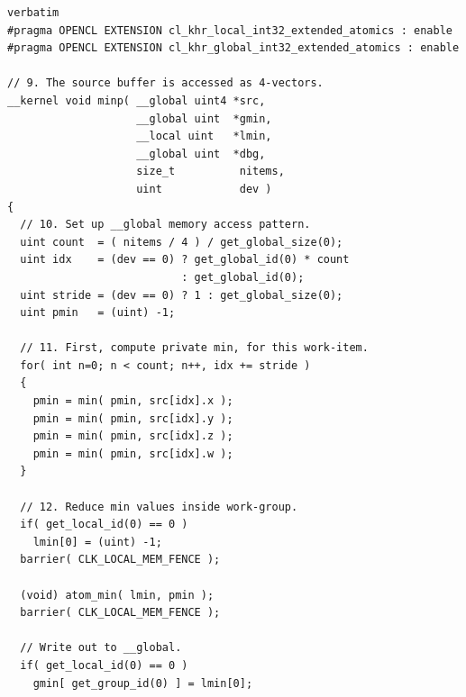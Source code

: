 {
\begin{lstlisting}verbatim
#pragma OPENCL EXTENSION cl_khr_local_int32_extended_atomics : enable
#pragma OPENCL EXTENSION cl_khr_global_int32_extended_atomics : enable
                                                                    
// 9. The source buffer is accessed as 4-vectors.                  
__kernel void minp( __global uint4 *src,                            
                    __global uint  *gmin,
                    __local uint   *lmin,                             
                    __global uint  *dbg,                             
                    size_t          nitems,                          
                    uint            dev )                            
{                                                                   
  // 10. Set up __global memory access pattern.                    
  uint count  = ( nitems / 4 ) / get_global_size(0);                
  uint idx    = (dev == 0) ? get_global_id(0) * count             
                           : get_global_id(0);                    
  uint stride = (dev == 0) ? 1 : get_global_size(0);               
  uint pmin   = (uint) -1;                                        
                                                                    
  // 11. First, compute private min, for this work-item.           
  for( int n=0; n < count; n++, idx += stride )                    
  {                                                                
    pmin = min( pmin, src[idx].x );                               
    pmin = min( pmin, src[idx].y );                               
    pmin = min( pmin, src[idx].z );                               
    pmin = min( pmin, src[idx].w );                               
  }                                                                
                                                                    
  // 12. Reduce min values inside work-group.                      
  if( get_local_id(0) == 0 )                                       
    lmin[0] = (uint) -1;                                          
  barrier( CLK_LOCAL_MEM_FENCE );                                  

  (void) atom_min( lmin, pmin );                                   
  barrier( CLK_LOCAL_MEM_FENCE );                                  
                                                                    
  // Write out to __global.                                        
  if( get_local_id(0) == 0 )                                       
    gmin[ get_group_id(0) ] = lmin[0];                            
                                                               

\end{lstlisting}}
